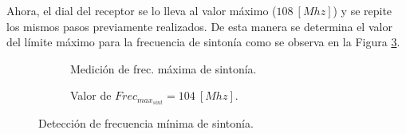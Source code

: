     Ahora, el dial del receptor se lo lleva al valor máximo (\(108~[Mhz]\)) y se 
    repite los mismos pasos previamente realizados. De esta manera se determina el valor 
    del límite máximo para la frecuencia de sintonía como se observa en la Figura 
    \ref{fig:FrecMaxtSint}.  
      \begin{figure}[H]
        \centering
        \begin{subfigure}[ht]{0.48\textwidth}
          \caption{Medición de frec. máxima de sintonía.}
          \label{fig:FrecMaxSintConGen}
        \end{subfigure}
        \hfill 
        \begin{subfigure}[ht]{0.48\textwidth}
          \caption{Valor de  \(Frec_{max_{sint}} = 104~[Mhz]\).}
          \label{fig:FrecMaxSintValor}
        \end{subfigure}
        \caption{Detección de frecuencia mínima de sintonía.}
        \label{fig:FrecMaxtSint}
      \end{figure}

